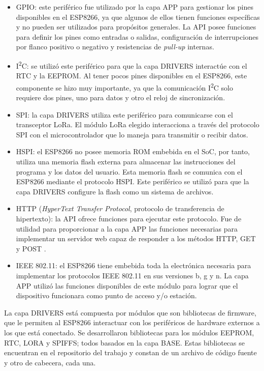 \begin{itemize}
	\item GPIO: este periférico fue utilizado por la capa APP para gestionar los pines disponibles en el ESP8266, ya que algunos de ellos tienen funciones específicas y no pueden ser utilizados para propósitos generales. La API posee funciones para definir los pines como entradas o salidas, configuración de interrupciones por flanco positivo o negativo y resistencias de \textit{pull-up} internas.
	\item I\textsuperscript{2}C: se utilizó este periférico para que la capa DRIVERS interactúe con el RTC y la EEPROM. Al tener pocos pines disponibles en el ESP8266, este componente se hizo muy importante, ya que la comunicación I\textsuperscript{2}C solo requiere dos pines, uno para datos y otro el reloj de sincronización.
	\item SPI: la capa DRIVERS utiliza este periférico para comunicarse con el transceptor LoRa. El módulo LoRa elegido interacciona a través del protocolo SPI con el microcontrolador que lo maneja para transmitir o recibir datos.
	\item HSPI: el ESP8266 no posee memoria ROM embebida en el SoC, por tanto, utiliza una memoria flash externa para almacenar las instrucciones del programa y los datos del usuario. Esta memoria flash se comunica con el ESP8266 mediante el protocolo HSPI. Este periférico se utilizó para que la capa DRIVERS configure la flash como un sistema de archivos.
	\item HTTP (\textit{HyperText Transfer Protocol}, protocolo de transferencia de hipertexto): la API ofrece funciones para ejecutar este protocolo. Fue de utilidad para proporcionar a la capa APP las funciones necesarias para implementar un servidor web capaz de responder a los métodos HTTP, GET y POST \citep{WEBSITE:20}.
	\item IEEE 802.11: el ESP8266 tiene embebida toda la electrónica necesaria para implementar los protocolos IEEE 802.11 en sus versiones b, g y n. La capa APP utilizó las funciones disponibles de este módulo para lograr que el dispositivo funcionara como punto de acceso y/o estación.
\end{itemize}

La capa DRIVERS está compuesta por módulos que son bibliotecas de firmware, que le permiten al ESP8266 interactuar con los periféricos de hardware externos a los que está conectado. Se desarrollaron bibliotecas para los módulos EEPROM, RTC, LORA y SPIFFS; todos basados en la capa BASE. Estas bibliotecas se encuentran en el repositorio del trabajo y constan de un archivo de código fuente y otro de cabecera, cada una.

